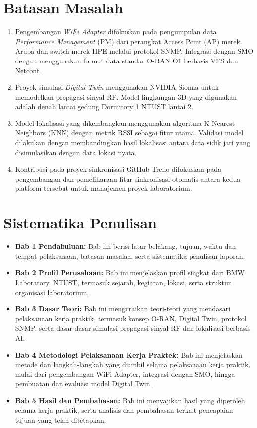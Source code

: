 \section{Batasan Masalah}
\begin{enumerate}
    \item Pengembangan \textit{WiFi Adapter} difokuskan pada pengumpulan data \textit{Performance Management} (PM) dari perangkat Access Point (AP) merek Aruba dan switch merek HPE melalui protokol SNMP. Integrasi dengan SMO dengan menggunakan format data standar O-RAN O1 berbasis VES dan Netconf.
    \item Proyek simulasi \textit{Digital Twin} menggunakan NVIDIA Sionna untuk memodelkan propagasi sinyal RF. Model lingkungan 3D yang digunakan adalah denah lantai gedung Dormitory 1 NTUST lantai 2.
    \item Model lokalisasi yang dikembangkan menggunakan algoritma K-Nearest Neighbors (KNN) dengan metrik RSSI sebagai fitur utama. Validasi model dilakukan dengan membandingkan hasil lokalisasi antara data sidik jari yang disimulasikan dengan data lokasi nyata.
    \item Kontribusi pada proyek sinkronisasi GitHub-Trello difokuskan pada pengembangan dan pemeliharaan fitur sinkronisasi otomatis antara kedua platform tersebut untuk manajemen proyek laboratorium.
\end{enumerate}

\section{Sistematika Penulisan}
\begin{itemize}
	\item \textbf{Bab 1 Pendahuluan:} Bab ini berisi latar belakang, tujuan, waktu dan tempat pelaksanaan, batasan masalah, serta sistematika penulisan laporan.
	\item \textbf{Bab 2 Profil Perusahaan:} Bab ini menjelaskan profil singkat dari BMW Laboratory, NTUST, termasuk sejarah, kegiatan, lokasi, serta struktur organisasi laboratorium.
    \item \textbf{Bab 3 Dasar Teori:} Bab ini menguraikan teori-teori yang mendasari pelaksanaan kerja praktik, termasuk konsep O-RAN, Digital Twin, protokol SNMP, serta dasar-dasar simulasi propagasi sinyal RF dan lokalisasi berbasis AI.
    \item \textbf{Bab 4 Metodologi Pelaksanaan Kerja Praktek:} Bab ini menjelaskan metode dan langkah-langkah yang diambil selama pelaksanaan kerja praktik, mulai dari pengembangan WiFi Adapter, integrasi dengan SMO, hingga pembuatan dan evaluasi model Digital Twin.
    \item \textbf{Bab 5 Hasil dan Pembahasan:} Bab ini menyajikan hasil yang diperoleh selama kerja praktik, serta analisis dan pembahasan terkait pencapaian tujuan yang telah ditetapkan.
\end{itemize}

